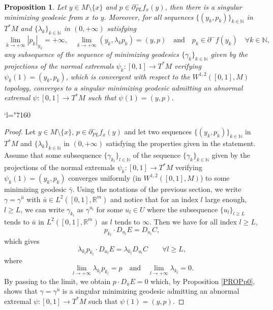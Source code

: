 \documentclass[JEP,XML,SOM,Unicode,NoFloatCountersInSection,published]{cedram}
\newcommand{\Changel}{\mathcode`l="7160}
\newcommand\R{\mathbb R}
\newcommand\N{\mathbb N}
\newtheorem{proposition}[theorem]{Proposition}
\theoremstyle{definition}
\begin{document}
\begin{proposition}\label{PROPsub3}
Let $y\in M\setminus \{x\}$ and $p\in \partial^-_{PL} f_x(y)$, then there is a singular minimizing geodesic from $x$ to $y$. Moreover, for all sequences $\{(y_k,p_k)\}_{k\in \N}$ in $T^*M$ and $\{\lambda_k\}_{k\in \N}$ in $(0,+\infty)$ satisfying
\[
\lim_{k\to +\infty} \left|p_k\right|_{y_k} = +\infty, \quad \lim_{k\to +\infty} \left(y_k,\lambda_k p_k\right) = (y,p)
\quad
\text{and} \quad p_k \in \partial^-f(y_k) \quad \forall k \in \N,
\]
any subsequence of the sequence of minimizing geodesics $\{\gamma_k\}_{k\in \N}$ given by the projections of the normal extremals $\psi_k:[0,1] \to T^*M$ verifying $\psi_k(1)=(y_k,p_k)$, which is convergent with respect to the $W^{1,2}([0,1],M)$ topology, converges to a singular minimizing geodesic admitting an abnormal extremal $\psi:[0,1] \to T^*M$ such that $\psi(1)=(y,p)$.
\end{proposition}

\Changel

\begin{proof}%
Let $y\in M\setminus \{x\}$, $p\in \partial^-_{PL} f_x(y)$ and let two sequences $\{(y_k,p_k)\}_{k\in \N}$ in $T^*M$ and $\{\lambda_k\}_{k\in \N}$ in $(0,+\infty)$ satisfying the properties given in the statement. Assume that some subsequence $\{\gamma_{k_l}\}_{l\in \N}$ of the sequence $\{\gamma_k\}_{k\in \N}$ given by the projections of the normal extremals $\psi_k:[0,1] \to T^*M$ verifying $\psi_k(1)=(y_k,p_k)$ converges uniformly (in $W^{1,2}([0,1],M)$) to some minimizing geodesic $\bar{\gamma}$. Using the notations of the previous section, we write $\gamma=\gamma^{\bar{u}}$ with $\bar{u} \in L^2([0,1],\R^m)$ and notice that for an index $l$ large enough, $l\geq L$, we can write $\gamma_{k_l}$ as $\gamma^{u_l}$ for some $u_l\in U$ where the subsequence $\{u_l\}_{l\geq L}$ tends to $\bar{u}$ in $L^2([0,1],\R^m)$ as $l$ tends to $\infty$. Then we have for all index $l\geq L$,
\[
p_{k_l}\cdot D_{u_l}E = D_{u_l}C,
\]
which gives
\[
\lambda_{k_l} p_{k_l}\cdot D_{u_l}E = \lambda_{k_l} D_{u_l}C \qquad \forall l \geq L,
\]
where
\[
\lim_{l\to +\infty} \lambda_{k_l} p_{k_l} = p \quad \text{and} \quad \lim_{l\to +\infty} \lambda_{k_l} =0.
\]
By passing to the limit, we obtain $p \cdot D_{\bar{u}}E=0$ which, by Proposition \ref{PROPp0}, shows that $\gamma=\gamma^{\bar{u}}$ is a singular minimizing geodesic admitting an abnormal extremal $\psi:[0,1] \to T^*M$ such that $\psi(1)=(y,p)$.
\end{proof}
\end{document}
